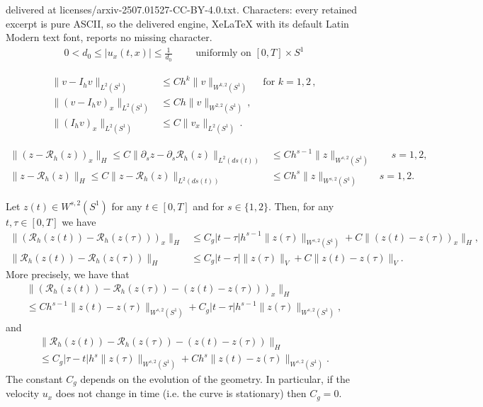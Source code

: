 \documentclass[10pt,a4paper]{amsart}
\begin{document}
delivered at licenses/arxiv-2507.01527-CC-BY-4.0.txt. Characters: every retained excerpt is pure ASCII, so the delivered engine, XeLaTeX with its default Latin Modern text font, reports no missing character.
\begin{align}\label{regularity}
 0<d_{0} \leq |u_{x}(t,x)| \leq \frac{1}{d_{0}} \qquad \text{ uniformly on } [0,T] \times S^{1}
\end{align}

\begin{align}
\label{(4.2)}
\| v-I_h v \|_{L^2(S^1)} &\leq C h^k \|v \|_{W^{k,2}(S^1)} &\text{ for $k=1,2$}\,,\\
\label{(4.2)bis}
\| (v-I_h v)_x \|_{L^2 (S^1)} & \leq C h \| v \|_{W^{2,2} (S^1)}\,,\\
\label{(4.2)extra}
 \| (I_{h} v)_{x} \|_{L^{2} (S^{1})} & \leq C \| v_{x} \|_{ L^{2}(S^{1})}\, . 
\end{align} 

\begin{align} \label{Ritz1}
 \| (z - \mathcal{R}_{h} (z) )_{x}\|_{H} \leq C \| \partial_{s} z - \partial_{s} \mathcal{R}_{h} (z) \|_{L^{2}(ds(t))} &\leq C h^{s-1} \|z\|_{W^{s,2}(S^{1})} \qquad s=1,2,\\
\label{Ritz2}
 \| z - \mathcal{ R}_{h} (z) \|_{H} \leq C \| z - \mathcal{R}_{h} (z) \|_{L^{2}(ds(t))} &\leq C h^{s} \|z\|_{W^{s,2}(S^{1})} \qquad s=1,2.
\end{align}

\begin{lemma}
Let $z(t) \in W^{s,2}(S^{1})$ for any $t \in [0,T]$ and for $s \in \{ 1,2 \}$. Then, for any $t, \tau \in [0,T]$ we have
\begin{align}
\label{RH1}
 \| (\mathcal{R}_{h} (z(t)) -\mathcal{R}_{h} (z(\tau)) )_{x} \|_{H}& \leq C_{g} |t -\tau| h^{s-1}\| z(\tau)\|_{W^{s,2}(S^{1})} + C \| (z(t) -z(\tau) )_{x} \|_{H},\\
 \label{RH2}
 \| \mathcal{R}_{h} (z(t)) -\mathcal{R}_{h} (z(\tau)) \|_{H}& \leq C_{g} |t -\tau| \| z(\tau)\|_{V}+
 C\| z(t) -z(\tau) \|_{V}.
\end{align}
More precisely, we have that
\begin{multline}\label{RH3}
\| (\mathcal{R}_{h} (z(t)) -\mathcal{R}_{h} (z(\tau)) - (z(t) -z(\tau)) )_{x}\|_{H} \\
\leq Ch^{s-1}
\| z(t) -z(\tau)\|_{W^{s,2}(S^{1})} + C_{g} |t -\tau|h^{s-1}
\| z(\tau)\|_{W^{s,2}(S^{1})} ,
\end{multline}
and 
\begin{multline}\label{RH4}
\| \mathcal{R}_{h} (z(t)) -\mathcal{R}_{h} (z(\tau)) - (z(t) -z(\tau)) \|_{H} \\
 \leq C_{g}|\tau-t|h^{s}\| z(\tau)\|_{W^{s,2}(S^{1})} + Ch^{s}
\| z(t) -z(\tau)\|_{W^{s,2}(S^{1})} .
\end{multline}
The constant $C_{g}$ depends on the evolution of the geometry.
In particular, if the velocity $u_{x}$ does not change in time (i.e. the curve is stationary) then $C_{g}=0$.
\end{lemma}
\end{document}
